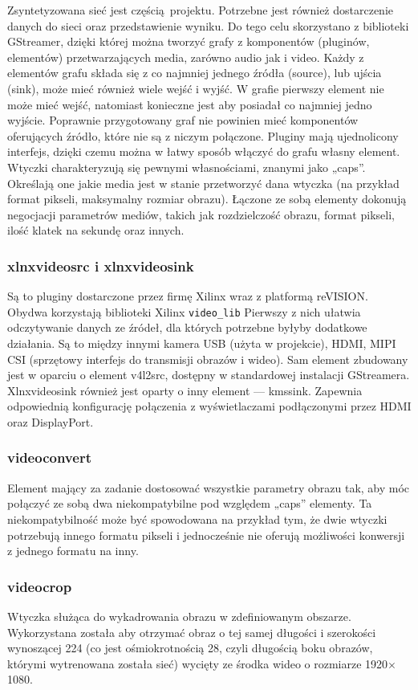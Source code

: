 \documentclass[12pt, oneside, a4paper]{article}
\begin{document}
Zsyntetyzowana sieć jest częścią projektu. Potrzebne jest również dostarczenie
danych do sieci oraz przedstawienie wyniku.
Do tego celu skorzystano z biblioteki GStreamer, dzięki której można
tworzyć grafy z komponentów (pluginów, elementów)
przetwarzających media, zarówno audio jak i video.
Każdy z elementów grafu składa się z co najmniej jednego źródła (source),
lub ujścia (sink), może mieć również wiele wejść i wyjść. W grafie pierwszy
element nie może mieć wejść, natomiast konieczne jest aby posiadał co najmniej
jedno wyjście. Poprawnie przygotowany graf nie powinien mieć komponentów
oferujących źródło, które nie są z niczym połączone.
Pluginy mają ujednolicony interfejs, dzięki czemu można w łatwy sposób
włączyć do grafu własny element. Wtyczki charakteryzują się
pewnymi własnościami, znanymi jako „caps”. Określają one jakie 
media jest w stanie przetworzyć dana wtyczka (na przykład format pikseli,
maksymalny rozmiar obrazu). 
Łączone ze sobą elementy dokonują negocjacji
parametrów mediów, takich jak rozdzielczość obrazu, format pikseli,
ilość klatek na sekundę oraz innych.

\subsubsection{xlnxvideosrc i xlnxvideosink}
Są to pluginy dostarczone przez firmę Xilinx wraz z platformą reVISION.
Obydwa korzystają biblioteki Xilinx \lstinline{video_lib}
Pierwszy z nich ułatwia odczytywanie danych ze źródeł, dla których potrzebne
byłyby dodatkowe działania. Są to między innymi kamera USB (użyta w projekcie),
HDMI, MIPI CSI (sprzętowy interfejs do transmisji obrazów i wideo).
Sam element zbudowany jest w oparciu o element v4l2src, dostępny
w standardowej instalacji GStreamera.
Xlnxvideosink również jest oparty o inny element --- kmssink.
Zapewnia odpowiednią konfigurację połączenia z wyświetlaczami
podłączonymi przez HDMI oraz DisplayPort.

\subsubsection{videoconvert}
Element mający za zadanie dostosować wszystkie parametry obrazu tak,
aby móc połączyć ze sobą dwa niekompatybilne pod względem „caps” elementy.
Ta niekompatybilność może być spowodowana na przykład tym, że dwie
wtyczki potrzebują innego formatu pikseli i jednocześnie nie oferują
możliwości konwersji z jednego formatu na inny.

\subsubsection{videocrop}
Wtyczka służąca do wykadrowania obrazu w zdefiniowanym obszarze.
Wykorzystana została aby otrzymać obraz o tej samej długości
i szerokości wynoszącej 224 (co jest ośmiokrotnością 28, czyli
długością boku obrazów, którymi wytrenowana została sieć) wycięty
ze środka wideo o rozmiarze 1920\(\times \)1080.
\end{document}
